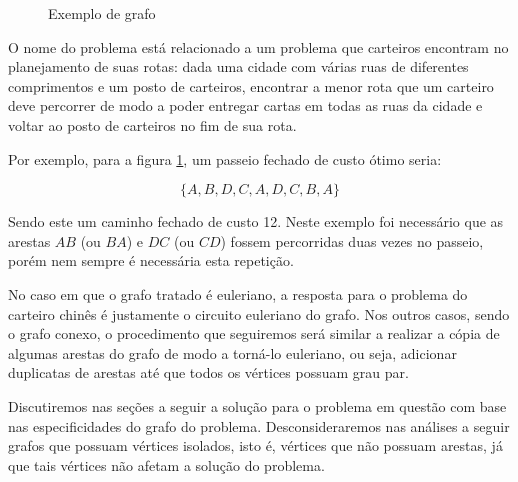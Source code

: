 \documentclass[12pt, a4paper]{article}
\begin{document}
\begin{figure} 
    \centering
	\caption{Exemplo de grafo}
	\label{graph}
\end{figure}

O nome do problema está relacionado a um problema que carteiros encontram no planejamento de suas rotas: dada uma cidade com várias ruas de diferentes comprimentos e um posto de carteiros, encontrar a menor rota que um carteiro deve percorrer de modo a poder entregar cartas em todas as ruas da cidade e voltar ao posto de carteiros no fim de sua rota.


Por exemplo, para a figura \ref{graph}, um passeio fechado de custo ótimo seria: 

\[ \{A, B, D, C, A, D, C, B, A\} \] 

Sendo este um caminho fechado de custo 12.
Neste exemplo foi necessário que as arestas $AB$ (ou $BA$) e $DC$ (ou $CD$) fossem percorridas duas vezes no passeio, porém nem sempre é necessária esta repetição.

No caso em que o grafo tratado é euleriano, a resposta para o problema do carteiro chinês é justamente o circuito euleriano do grafo.
Nos outros casos, sendo o grafo conexo, o procedimento que seguiremos será similar a realizar a cópia de algumas arestas do grafo de modo a torná-lo euleriano, ou seja, adicionar duplicatas de arestas até que todos os vértices possuam grau par.

Discutiremos nas seções a seguir a solução para o problema em questão com base nas especificidades do grafo do problema. 
Desconsideraremos nas análises a seguir grafos que possuam vértices isolados, isto é, vértices que não possuam arestas, já que tais vértices não afetam a solução do problema.
\end{document}
